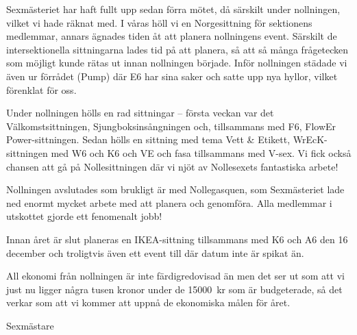 \documentclass[../_main/handlingar.tex]{subfiles}
\begin{document}
Sexmästeriet har haft fullt upp sedan förra mötet, då särskilt under nollningen, vilket vi hade räknat med. I våras höll vi en Norgesittning för sektionens medlemmar, annars ägnades tiden åt att planera nollningens event. Särskilt de intersektionella sittningarna lades tid på att planera, så att så många frågetecken som möjligt kunde rätas ut innan nollningen började. Inför nollningen städade vi även ur förrådet (Pump) där E6 har sina saker och satte upp nya hyllor, vilket förenklat för oss.

Under nollningen hölls en rad sittningar – första veckan var det Välkomstsittningen, Sjungboksinsångningen och, tillsammans med F6, FlowEr Power-sittningen. Sedan hölls en sittning med tema Vett \& Etikett, WrEcK-sittningen med W6 och K6 och VE och fasa tillsammans med V-sex. Vi fick också chansen att gå på Nollesittningen där vi njöt av Nollesexets fantastiska arbete!

Nollningen avslutades som brukligt är med Nollegasquen, som Sexmästeriet lade ned enormt mycket arbete med att planera och genomföra. Alla medlemmar i utskottet gjorde ett fenomenalt jobb!

Innan året är slut planeras en IKEA-sittning tillsammans med K6 och A6 den 16 december och troligtvis även ett event till där datum inte är spikat än.

All ekonomi från nollningen är inte färdigredovisad än men det ser ut som att vi just nu ligger några tusen kronor under de \SI{15000}{kr} som är budgeterade, så det verkar som att vi kommer att uppnå de ekonomiska målen för året.

\begin{signatures}{1}
    \mvh
    \signature{Linnea Sjödahl}{Sexmästare}
\end{signatures}
\end{document}
